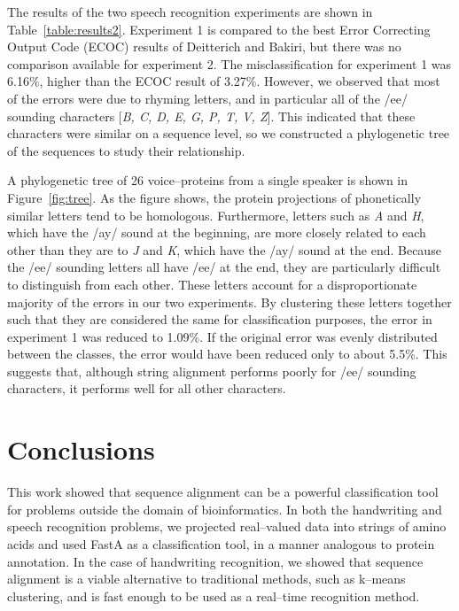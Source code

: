 		The results of the two speech recognition experiments are shown in
		Table~\vref{table:results2}.
		Experiment 1 is compared
		to the best Error Correcting Output Code (ECOC) results of Deitterich
		and Bakiri,
		but
		there was no comparison available for experiment 2.	
		The misclassification for experiment 1 was 6.16\%, 
		higher than the ECOC result of 3.27\%.  However, we observed that
		most of the errors were due to rhyming letters, and in particular
		all of the /ee/ sounding characters [\emph{B, C, D, E, G, P, T, V, Z}].
		This indicated that these characters were similar on a sequence level,
		so we constructed a phylogenetic tree of the sequences to study their
		relationship.

	

		A phylogenetic tree of 26 voice--proteins from a single
		speaker is shown in Figure~\vref{fig:tree}.  As the figure
		shows, the protein projections of phonetically similar
		letters tend to be homologous.	Furthermore, letters such
		as \emph{A} and \emph{H}, which have the /ay/ sound at the
		beginning, are more closely related to each other than
		they are to \emph{J} and \emph{K}, which have the /ay/
		sound at the end.  Because the /ee/ sounding letters all
		have /ee/ at the end, they are particularly difficult
		to distinguish from each other.  These letters account
		for a disproportionate majority of the errors in our two
		experiments.  By clustering these letters together such that
		they are considered the same for classification purposes,
		the error in experiment 1 was reduced to 1.09\%.  If the
		original error was evenly distributed between the classes,
		the error would have been reduced only to about 5.5\%.
		This suggests that, although string alignment performs
		poorly for /ee/ sounding characters, it performs well for
		all other characters.


\section{Conclusions}
		This work showed that sequence alignment can be a powerful
		classification tool for problems outside the domain
		of bioinformatics.  In both the handwriting and speech
		recognition problems, we projected real--valued data into
		strings of amino acids and used FastA as a classification
		tool, in a manner analogous to protein annotation.  In the
		case of handwriting recognition, we showed that sequence
		alignment is a viable alternative to traditional methods,
		such as k--means clustering, and is fast enough to be used
		as a real--time recognition method.


